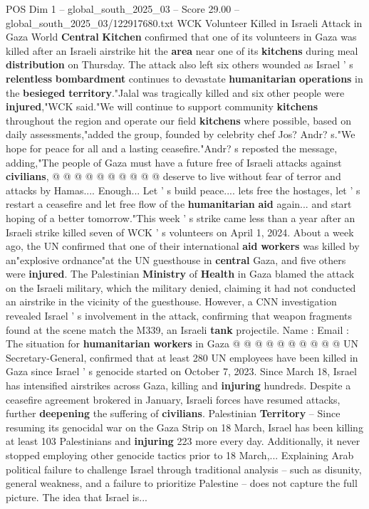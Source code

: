 \begin{textsample}{POS Dim 1 – global\_south\_2025\_03 – Score 29.00 – global\_south\_2025\_03/122917680.txt}
WCK Volunteer Killed in Israeli Attack in Gaza World \textbf{Central} \textbf{Kitchen} confirmed that one of its volunteers in Gaza was killed after an Israeli airstrike hit the \textbf{area} near one of its \textbf{kitchens} during meal \textbf{distribution} on Thursday.
The attack also left six others wounded as Israel ' s \textbf{relentless} \textbf{bombardment} continues to devastate \textbf{humanitarian} \textbf{operations} in the \textbf{besieged} \textbf{territory}."Jalal was tragically killed and six other people were \textbf{injured},"WCK said."We will continue to support community \textbf{kitchens} throughout the region and operate our field \textbf{kitchens} where possible, based on daily assessments,"added the group, founded by celebrity chef Jos?
Andr? s."We hope for peace for all and a lasting ceasefire."Andr? s reposted the message, adding,"The people of Gaza must have a future free of Israeli attacks against \textbf{civilians}, @ @ @ @ @ @ @ @ @ @ deserve to live without fear of terror and attacks by Hamas....
Enough...
Let ' s build peace.... lets free the hostages, let ' s restart a ceasefire and let free flow of the \textbf{humanitarian} \textbf{aid} again... and start hoping of a better tomorrow."This week ' s strike came less than a year after an Israeli strike killed seven of WCK ' s volunteers on April 1, 2024.
About a week ago, the UN confirmed that one of their international \textbf{aid} \textbf{workers} was killed by an"explosive ordnance"at the UN guesthouse in \textbf{central} Gaza, and five others were \textbf{injured}.
The Palestinian \textbf{Ministry} of \textbf{Health} in Gaza blamed the attack on the Israeli military, which the military denied, claiming it had not conducted an airstrike in the vicinity of the guesthouse.
However, a CNN investigation revealed Israel ' s involvement in the attack, confirming that weapon fragments found at the scene match the M339, an Israeli \textbf{tank} projectile.
Name : Email : The situation for \textbf{humanitarian} \textbf{workers} in Gaza @ @ @ @ @ @ @ @ @ @ UN Secretary-General, confirmed that at least 280 UN employees have been killed in Gaza since Israel ' s genocide started on October 7, 2023.
Since March 18, Israel has intensified airstrikes across Gaza, killing and \textbf{injuring} hundreds.
Despite a ceasefire agreement brokered in January, Israeli forces have resumed attacks, further \textbf{deepening} the suffering of \textbf{civilians}.
Palestinian \textbf{Territory} -- Since resuming its genocidal war on the Gaza Strip on 18 March, Israel has been killing at least 103 Palestinians and \textbf{injuring} 223 more every day.
Additionally, it never stopped employing other genocide tactics prior to 18 March,...
Explaining Arab political failure to challenge Israel through traditional analysis -- such as disunity, general weakness, and a failure to prioritize Palestine -- does not capture the full picture.
The idea that Israel is...


\end{textsample}
